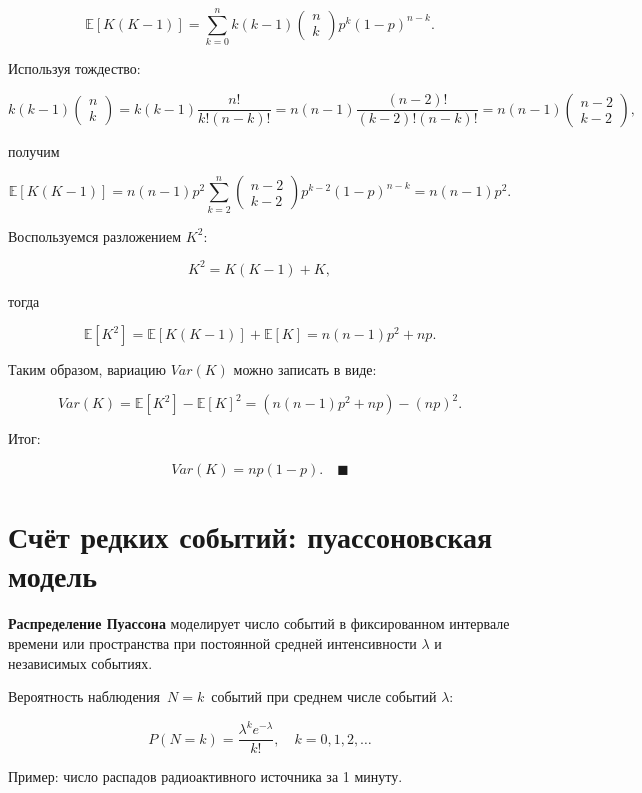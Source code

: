 \documentclass[
  russian,
  letterpaper,
]{scrbook}
\begin{document}
\[\mathbb{E}[K(K-1)]=\sum_{k=0}^n k(k-1) \begin{pmatrix} n\\k\end{pmatrix} p^k(1-p)^{n-k}.\]

Используя тождество:

\[k(k-1) \begin{pmatrix} n\\k\end{pmatrix}=k(k-1)\frac{n!}{k!(n-k)!}=n(n-1)\frac{(n-2)!}{(k-2)!(n-k)!}=n(n-1)\begin{pmatrix} n-2\\k-2\end{pmatrix},\]

получим

\[\mathbb{E}[K(K-1)]=n(n-1)p^2\sum_{k=2}^n \begin{pmatrix} n-2\\k-2\end{pmatrix} p^{k-2}(1-p)^{n-k}=n(n-1)p^2.\]

Воспользуемся разложением \(K^2\):

\[K^2=K(K-1)+K,\]

тогда

\[\mathbb{E}[K^2]=\mathbb{E}[K(K-1)]+\mathbb{E}[K]=n(n-1)p^2+np.\]

Таким образом, вариацию \(Var(K)\) можно записать в виде:

\[Var(K)=\mathbb{E}[K^2]-\mathbb{E}[K]^2=\left(n(n-1)p^2+np\right)-(np)^2.\]

Итог:

\[Var(K)=np(1-p). \quad \blacksquare\]

\section{Счёт редких событий: пуассоновская
модель}\label{ux441ux447ux451ux442-ux440ux435ux434ux43aux438ux445-ux441ux43eux431ux44bux442ux438ux439-ux43fux443ux430ux441ux441ux43eux43dux43eux432ux441ux43aux430ux44f-ux43cux43eux434ux435ux43bux44c}

\textbf{Распределение Пуассона} моделирует число событий в фиксированном
интервале времени или пространства при постоянной средней интенсивности
\(λ\) и независимых событиях.

Вероятность наблюдения~\(N=k\)~событий при среднем числе событий \(λ\):

\[P(N=k)=\frac{\lambda^k e^{-\lambda}}{k!}, \quad k=0,1,2,\dots\]

Пример: число распадов радиоактивного источника за 1 минуту.
\end{document}
